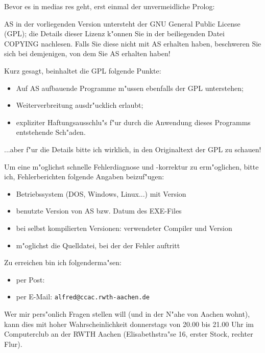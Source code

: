 \documentclass[12pt,a4paper,twoside]{report}
\newcommand{\tty}[1]{{\tt #1}}
\begin{document}
Bevor es in medias res geht, erst einmal der unvermeidliche Prolog:
\par
AS in der vorliegenden Version untersteht der GNU General Public License
(GPL); die Details dieser Lizenz k"onnen Sie in der beiliegenden Datei
COPYING nachlesen.  Falls Sie diese nicht mit AS erhalten haben,
beschweren Sie sich bei demjenigen, von dem Sie AS erhalten haben!
\par
Kurz gesagt, beinhaltet die GPL folgende Punkte:
\begin{itemize}
\item{Auf AS aufbauende Programme m"ussen ebenfalls der GPL unterstehen;}
\item{Weiterverbreitung ausdr"ucklich erlaubt;}
\item{expliziter Haftungsausschlu"s f"ur durch die Anwendung dieses
      Programms entstehende Sch"aden.}
\end{itemize}
...aber f"ur die Details bitte ich wirklich, in den Originaltext der GPL
zu schauen!
\par
Um eine m"oglichst schnelle Fehlerdiagnose und -korrektur zu erm"oglichen,
bitte ich, Fehlerberichten folgende Angaben beizuf"ugen:
\begin{itemize}
\item{Betriebssystem (DOS, Windows, Linux...) mit Version}
\item{benutzte Version von AS bzw. Datum des EXE-Files}
\item{bei selbst kompilierten Versionen: verwendeter Compiler und Version}
\item{m"oglichst die Quelldatei, bei der der Fehler auftritt}
\end{itemize}
Zu erreichen bin ich folgenderma"sen:
\begin{itemize}
\item{per Post: }
\item{per E-Mail: \tty{alfred@ccac.rwth-aachen.de}}
\end{itemize}
Wer mir pers"onlich Fragen stellen will (und in der N"ahe von Aachen
wohnt), kann dies mit hoher Wahrscheinlichkeit donnerstags von 20.00
bis 21.00 Uhr im Computerclub an der RWTH Aachen (Elisabethstra"se 16,
erster Stock, rechter Flur).
\end{document}
